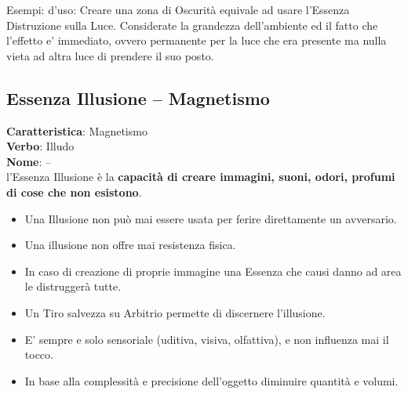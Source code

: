 \documentclass[a4paper,11pt,twoside,openany]{book}
\begin{document}
\bigskip

Esempi: d'uso:
Creare una zona di Oscurità equivale ad usare l'Essenza Distruzione sulla Luce. Considerate la grandezza dell'ambiente ed il fatto che l'effetto e' immediato, ovvero permanente per la luce che era presente ma nulla vieta ad altra luce di prendere il suo posto.
\pagebreak

\subsection{Essenza Illusione -- Magnetismo}

\label{essenza-illusione---magnetismo}

\textbf{Caratteristica}: Magnetismo\\
\textbf{Verbo}: Illudo\\
\textbf{Nome}: --\\

l'Essenza Illusione è la \textbf{capacità di creare immagini, suoni,
	odori, profumi di cose che non esistono}.
\begin{itemize}
	\item
	      Una Illusione non può mai essere usata per ferire direttamente un avversario.
	\item
	      Una illusione non offre mai resistenza fisica.
	\item
	      In caso di creazione di proprie immagine una Essenza che causi danno ad area le distruggerà tutte.
	\item
	      Un Tiro salvezza su Arbitrio permette di discernere l'illusione.
	\item
	      E' sempre e solo sensoriale (uditiva, visiva, olfattiva), e non influenza mai il tocco.
	\item
	      In base alla complessità e precisione dell'oggetto diminuire quantità e volumi.
\end{itemize}

\bigskip
\end{document}
